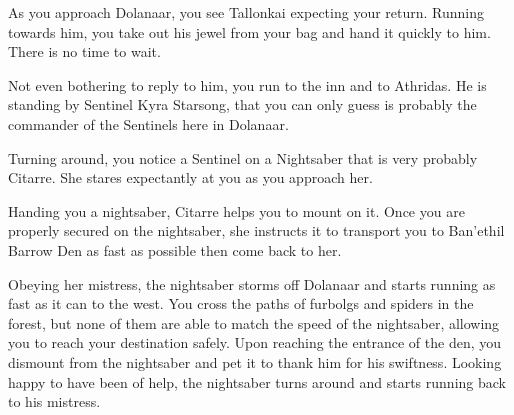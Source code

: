 As you approach Dolanaar, you see Tallonkai expecting your return. Running towards him, you take out his jewel from your bag and hand it quickly to him. There is no time to wait.


Not even bothering to reply to him, you run to the inn and to Athridas. He is standing by Sentinel Kyra Starsong, that you can only guess is probably the commander of the Sentinels here in Dolanaar.





Turning around, you notice a Sentinel on a Nightsaber that is very probably Citarre. She stares expectantly at you as you approach her.


Handing you a nightsaber, Citarre helps you to mount on it. Once you are properly secured on the nightsaber, she instructs it to transport you to Ban'ethil Barrow Den as fast as possible then come back to her.

Obeying her mistress, the nightsaber storms off Dolanaar and starts running as fast as it can to the west. You cross the paths of furbolgs and spiders in the forest, but none of them are able to match the speed of the nightsaber, allowing you to reach your destination safely. Upon reaching the entrance of the den, you dismount from the nightsaber and pet it to thank him for his swiftness. Looking happy to have been of help, the nightsaber turns around and starts running back to his mistress. %
